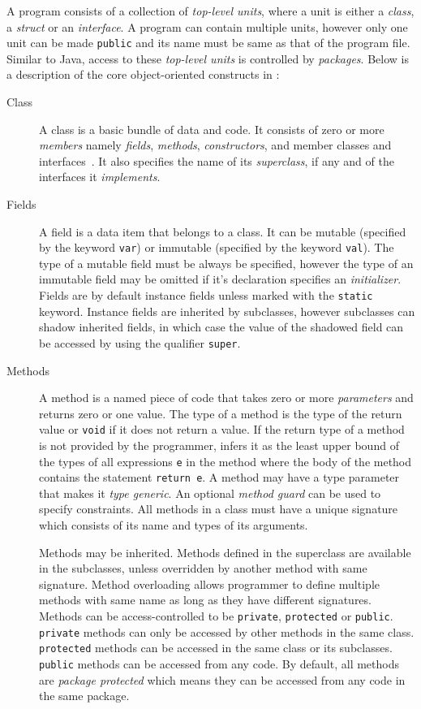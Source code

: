 A program consists of a collection of \emph{top-level units}, where a unit is
either a \emph{class}, a \emph{struct} or an \emph{interface}. A program can
contain multiple units, however only one unit can be made \texttt{public} and
its name must be same as that of the program file. Similar to Java, access to
these \emph{top-level units} is controlled by \emph{packages}. Below is a
description of the core object-oriented constructs in \xten: 

\begin{description}

\item[Class] A class is a basic bundle of data and code. It consists of zero or
more \emph{members} namely \emph{fields}, \emph{methods}, \emph{constructors},
and member classes and interfaces~\cite{x10intro}. It also specifies the name of its
\emph{superclass}, if any and of the interfaces it \emph{implements}.  

\item[Fields] A field is a data item that belongs to a class. It can be mutable
(specified by the keyword  \texttt{var}) or immutable (specified by the keyword
\texttt{val}). The type of a mutable field must be always be specified, however
the type of an immutable field may be omitted if it's declaration specifies an
\emph{initializer}. Fields are by default instance fields unless marked with the
\texttt{static} keyword. Instance fields are inherited by subclasses, however
subclasses can shadow inherited fields, in which case the value of the shadowed
field can be accessed by using the qualifier \texttt{super}.


\item[Methods] A method is a named piece of code that takes zero or more
\emph{parameters} and returns zero or one value. The type of a method is
the type of the return value or \texttt{void} if it does not return a value.
If the return type of a method is not provided by the programmer, \xten infers
it as the least upper bound of the types of all expressions \texttt{e} in the
method where the body of the method contains the statement \texttt{return e}.
A method may have a type parameter that makes it \emph{type generic}. An
optional \emph{method guard} can be used to specify constraints. All methods in
a class must have a unique signature which consists of its name and types of its
arguments.     

Methods may be inherited. Methods defined in the superclass are available in the
subclasses, unless overridden by another method with same signature. Method
overloading allows programmer to define multiple methods with same name as long
as they have different signatures. Methods can be access-controlled to be
\texttt{private}, \texttt{protected} or \texttt{public}. \texttt{private}
methods can only be accessed by other methods in the same class.
\texttt{protected} methods can be accessed in the same class or its subclasses.
\texttt{public} methods can be accessed from any code. By default, all methods
are \emph{package protected} which means they can be accessed from any code in
the same package.


\end{description}

